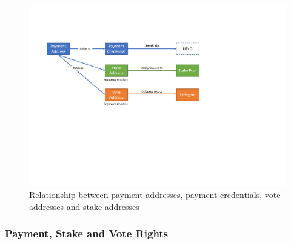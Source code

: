 \begin{figure}[h]
  \begin{center}
  \includegraphics[trim=0 250 150 80,clip,width=\textwidth]{Indirection}
  \end{center}
  \caption{Relationship between payment addresses, payment credentials, vote addresses and stake addresses}
  \label{fig:indirection}
\end{figure}

\subsubsection*{Payment, Stake and Vote Rights}

